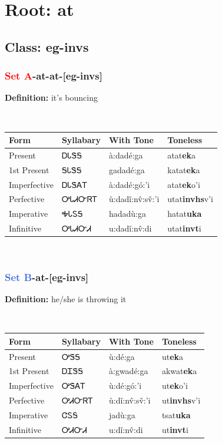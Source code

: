 \needspace{4in}
\section*{Root: at}
\nopagebreak
{}
\needspace{3in}
\subsection*{Class: eg-invs}
\nopagebreak
\needspace{2in}
\subsubsection*{\textcolor{Red}{Set A}{-}at{-}\textbf{at}{-}[eg-invs]}
\nopagebreak
\textbf{Definition: } it{\textquoteright}s bouncing
\\[0.5em]
\begin{tabularx}{\textwidth}{l X X X}%
\toprule%
\textbf{Form}&\textbf{Syllabary}&\textbf{With Tone}&\textbf{Toneless}\\%
\midrule%
Present&ᎠᏓᏕᎦ&à:dadé:ga&atat\textbf{ek}a\\%
1st Present&ᎦᏓᏕᎦ&gadadé:ga&katat\textbf{ek}a\\%
Imperfective&ᎠᏓᏕᎪᎢ&à:dadé:gó:’i&atat\textbf{ek}o'i\\%
Perfective&ᎤᏓᏗᏅᏒᎢ&ù:dadǐ:nv̂:sv̌:’i&utat\textbf{invhs}v'i\\%
Imperative&ᎭᏓᏚᎦ&hadadù:ga&hatat\textbf{uka}\\%
Infinitive&ᎤᏓᏗᏅᏗ&u:dadǐ:nv̂:di&utat\textbf{invt}i\\%
\bottomrule%
\end{tabularx}
\\[1em]
\needspace{2in}
\subsubsection*{\textcolor{RoyalBlue}{Set B}{-}\textbf{at}{-}[eg-invs]}
\nopagebreak
\textbf{Definition: } he/she is throwing it
\\[0.5em]
\begin{tabularx}{\textwidth}{l X X X}%
\toprule%
\textbf{Form}&\textbf{Syllabary}&\textbf{With Tone}&\textbf{Toneless}\\%
\midrule%
Present&ᎤᏕᎦ&ù:dé:ga&ut\textbf{ek}a\\%
1st Present&ᎠᏆᏕᎦ&à:gwadé:ga&akwat\textbf{ek}a\\%
Imperfective&ᎤᏕᎪᎢ&ù:dé:gó:’i&ut\textbf{ek}o'i\\%
Perfective&ᎤᏗᏅᏒᎢ&ù:dǐ:nv̂:sv̌:’i&ut\textbf{invhs}v'i\\%
Imperative&ᏣᏚᎦ&jadù:ga&tsat\textbf{uka}\\%
Infinitive&ᎤᏗᏅᏗ&u:dǐ:nv̂:di&ut\textbf{invt}i\\%
\bottomrule%
\end{tabularx}
\\[1em]
\needspace{3in}
